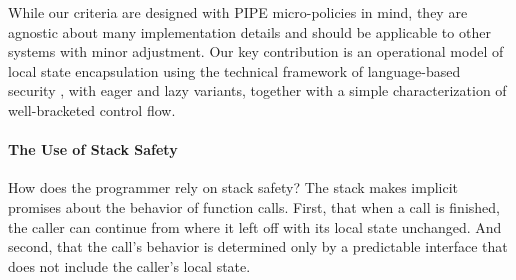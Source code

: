 \documentclass[acmsmall,review,anonymous]{acmart}\settopmatter{printfolios=true,printccs=false,printacmref=false}
\begin{document}
While our criteria are designed with PIPE micro-policies in mind, they are
agnostic about many implementation details and should be applicable to other
systems with minor adjustment.
%
Our key contribution is an operational model of local state encapsulation
using the technical framework of language-based security
, with eager and lazy variants,
together with a simple characterization of well-bracketed control flow.


%

\paragraph*{The Use of Stack Safety}

How does the programmer rely on stack safety? The stack makes implicit promises about
the behavior of function calls. First, that when a call is finished, the caller can continue
from where it left off with its local state unchanged. And second, that the call's
behavior is determined only by a predictable interface that does not include the caller's
local state.
\end{document}

